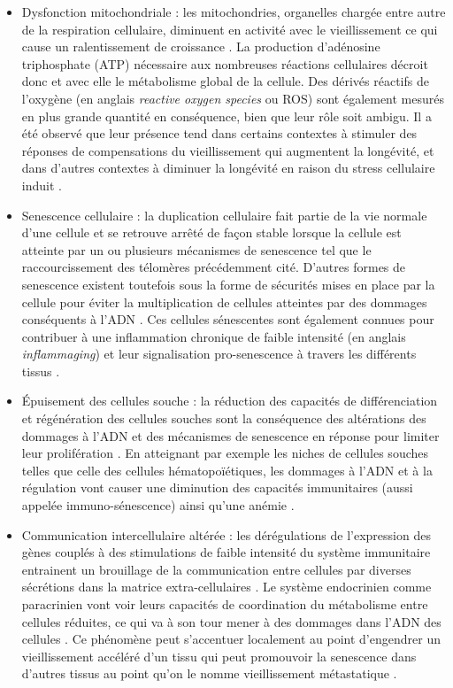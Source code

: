 \begin{itemize}
    \item Dysfonction mitochondriale : les mitochondries, organelles chargée entre autre de la respiration cellulaire, diminuent en activité avec le vieillissement ce qui cause un ralentissement de croissance \cite{Green2011Aug}. La production d'adénosine triphosphate (ATP) nécessaire aux nombreuses réactions cellulaires décroit donc et avec elle le métabolisme global de la cellule. Des dérivés réactifs de l'oxygène (en anglais \textit{reactive oxygen species} ou ROS) sont également mesurés en plus grande quantité en conséquence, bien que leur rôle soit ambigu. Il a été observé que leur présence tend dans certains contextes à stimuler des réponses de compensations du vieillissement qui augmentent la longévité, et dans d'autres contextes à diminuer la longévité en raison du stress cellulaire induit \cite{Ziegler2015Feb}.
    \item Senescence cellulaire : la duplication cellulaire fait partie de la vie normale d'une cellule et se retrouve arrêté de façon stable lorsque la cellule est atteinte par un ou plusieurs mécanismes de senescence tel que le raccourcissement des télomères précédemment cité. D'autres formes de senescence existent toutefois sous la forme de sécurités mises en place par la cellule pour éviter la multiplication de cellules atteintes par des dommages conséquents à l'ADN \cite{Khan2017Aug}. Ces cellules sénescentes sont également connues pour contribuer à une inflammation chronique de faible intensité (en anglais \textit{inflammaging}) \cite{Kuilman2010Nov,Franceschi2014} et leur signalisation pro-senescence à travers les différents tissus \cite{Khan2017Aug}.
    \item Épuisement des cellules souche : la réduction des capacités de différenciation et régénération des cellules souches sont la conséquence des altérations des dommages à l'ADN et des mécanismes de senescence en réponse pour limiter leur prolifération \cite{Sharpless2007Sep}. En atteignant par exemple les niches de cellules souches telles que celle des cellules hématopoïétiques, les dommages à l'ADN et à la régulation vont causer une diminution des capacités immunitaires (aussi appelée immuno-sénescence) ainsi qu'une anémie \cite{Lopez-Otin2013,Baker2016Feb}.
    \item Communication intercellulaire altérée : les dérégulations de l'expression des gènes couplés à des stimulations de faible intensité du système immunitaire entrainent un brouillage de la communication entre cellules par diverses sécrétions dans la matrice extra-cellulaires \cite{Lopez-Otin2013}. Le système endocrinien comme paracrinien vont voir leurs capacités de coordination du métabolisme entre cellules réduites, ce qui va à son tour mener à des dommages dans l'ADN des cellules \cite{Khan2017Aug}. Ce phénomène peut s'accentuer localement au point d'engendrer un vieillissement accéléré d'un tissu qui peut promouvoir la senescence dans d'autres tissus au point qu'on le nomme vieillissement métastatique \cite{Lavasani2012Jan}.
\end{itemize}
\hfill

